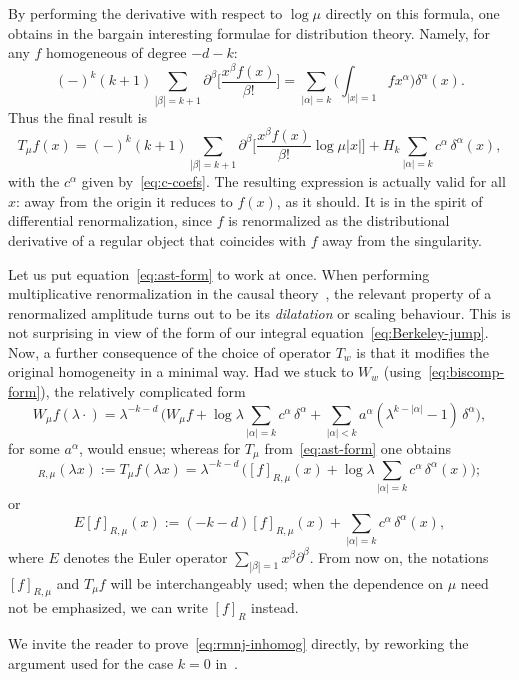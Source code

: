 \documentclass[a4paper,12pt]{article}
\renewcommand{\a}{\alpha}          %
\renewcommand{\b}{\beta}           %
\newcommand{\del}{\partial}        %
\newcommand{\dl}{\delta}           %
\newcommand{\la}{\lambda}          %
\newcommand{\7}{\dagger}           %
\theoremstyle{plain}
\theoremstyle{definition}
\begin{document}
By performing the derivative with respect to $\log\mu$ directly on
this formula, one obtains in the bargain interesting formulae for
distribution theory. Namely, for any $f$ homogeneous of degree $-d-k$:
\begin{equation}
(-)^k (k+1) \sum_{|\b|=k+1} \del^\b \biggl[ \frac{x^\b f(x)}{\b!}
\biggr] = \sum_{|\a|=k}\biggl( \int_{|x|=1} f x^\a \biggr) \dl^\a(x).
\label{eq:biscomp-form}
\end{equation}
Thus the final result is
\begin{equation}
T_\mu f(x) = (-)^k (k+1) \sum_{|\b|=k+1} \del^\b \biggl[
\frac{x^\b f(x)}{\b!} \log\mu|x| \biggr] +
H_k \sum_{|\a|=k} c^\a\,\dl^\a(x),
\label{eq:ast-form}
\end{equation}
with the $c^\a$ given by~\eqref{eq:c-coefs}. The resulting expression
is actually valid for all $x$: away from the origin it reduces to
$f(x)$, as it should. It is in the spirit of differential
renormalization, since $f$ is renormalized as the distributional
derivative of a regular object that coincides with $f$ away from the
singularity.

Let us put equation~\eqref{eq:ast-form} to work at once. When
performing multiplicative renormalization in the causal
theory~\cite{Flora}, the relevant property of a renormalized amplitude
turns out to be its \textit{dilatation} or scaling behaviour. This is
not surprising in view of the form of our integral
equation~\eqref{eq:Berkeley-jump}. Now, a further consequence of the
choice of operator $T_w$ is that it modifies the original homogeneity
in a minimal way. Had we stuck to $W_w$
(using~\eqref{eq:biscomp-form}), the relatively complicated form
$$
W_\mu f(\la\cdot) = \la^{-k-d} \, \biggl( W_\mu f
+ \log\la \sum_{|\a|=k} c^\a \,\dl^\a +
\sum_{|\a|<k} a^\a (\la^{k-|\a|} - 1) \,\dl^\a \biggr),
$$
for some $a^\a$, would ensue; whereas for $T_\mu$
{}from~\eqref{eq:ast-form} one obtains
\begin{equation}
[f]_{R,\mu}(\la x) := T_\mu f(\la x) =
\la^{-k-d} \, \biggl([f]_{R,\mu}(x)
+ \log\la \sum_{|\a|=k} c^\a\,\dl^\a(x) \biggr);
\label{eq:rmnj-inhomog}
\end{equation}
or
$$
E[f]_{R,\mu}(x) :=
(-k-d) [f]_{R,\mu}(x) + \sum_{|\a|=k} c^\a\,\dl^\a(x),
$$
where $E$ denotes the Euler operator $\sum_{|\b|=1} x^\b \del^\b$.
 From now on, the notations $[f]_{R,\mu}$ and $T_\mu f$ will be
interchangeably used; when the dependence on $\mu$ need not be
emphasized, we can write $[f]_{R}$ instead.

We invite the reader to prove~\eqref{eq:rmnj-inhomog} directly, by
reworking the argument used for the case $k = 0$
in~\cite[pp.~307--308]{Polaris}.
\end{document}
